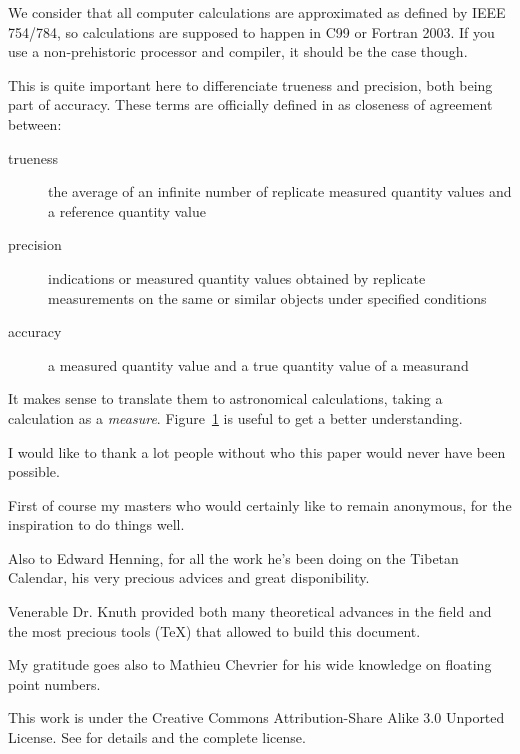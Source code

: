 We consider that all computer calculations are approximated as defined by IEEE 754/784, so calculations are supposed to happen in C99 or Fortran 2003. If you use a non-prehistoric processor and compiler, it should be the case though.



This is quite important here to differenciate trueness and precision, both being part of accuracy. These terms are officially defined in \cite{VIM} as closeness of agreement between:

\begin{description}
\item[trueness] the average of an infinite number of replicate measured quantity values and a reference quantity value
\item[precision] indications or measured quantity values obtained by replicate measurements on the same or similar objects under specified conditions
\item[accuracy] a measured quantity value and a true quantity value of a measurand
\end{description}

It makes sense to translate them to astronomical calculations, taking a calculation as a \emph{measure}. Figure~\ref{ATP} is useful to get a better understanding.

\begin{figure}[h]
\centering
\def\svgwidth{10cm}

\label{ATP}
\end{figure}


I would like to thank a lot people without who this paper would never have been possible.

First of course my masters who would certainly like to remain anonymous, for the inspiration to do things well.

Also to Edward Henning, for all the work he's been doing on the Tibetan Calendar, his very precious advices and great disponibility.

Venerable Dr. Knuth provided both many theoretical advances in the field and the most precious tools (\TeX ) that allowed to build this document.

My gratitude goes also to Mathieu Chevrier for his wide knowledge on floating point numbers.


This work is under the Creative Commons Attribution-Share Alike 3.0 Unported License. See \cite{CCASA} for details and the complete license.
